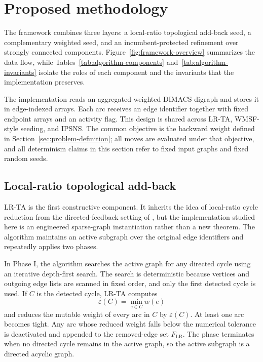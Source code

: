 \section{Proposed methodology}
\label{sec:algorithmic-framework}

The framework combines three layers: a local-ratio topological add-back seed, a complementary weighted seed, and an incumbent-protected refinement over strongly connected components. Figure~\ref{fig:framework-overview} summarizes the data flow, while Tables~\ref{tab:algorithm-components} and~\ref{tab:algorithm-invariants} isolate the roles of each component and the invariants that the implementation preserves.





The implementation reads an aggregated weighted DIMACS digraph and stores it in edge-indexed arrays. Each arc receives an edge identifier together with fixed endpoint arrays and an activity flag. This design is shared across LR-TA, WMSF-style seeding, and IPSNS. The common objective is the backward weight defined in Section~\ref{sec:problem-definition}; all moves are evaluated under that objective, and all determinism claims in this section refer to fixed input graphs and fixed random seeds.

\subsection{Local-ratio topological add-back}
\label{subsec:lrta}

LR-TA is the first constructive component. It inherits the idea of local-ratio cycle reduction from the directed-feedback setting of \cite{DF03}, but the implementation studied here is an engineered sparse-graph instantiation rather than a new theorem. The algorithm maintains an active subgraph over the original edge identifiers and repeatedly applies two phases.

In Phase I, the algorithm searches the active graph for any directed cycle using an iterative depth-first search. The search is deterministic because vertices and outgoing edge lists are scanned in fixed order, and only the first detected cycle is used. If \(C\) is the detected cycle, LR-TA computes
\begin{equation}
    \varepsilon(C)=\min_{e\in C} w(e)
    \label{eq:lrta-epsilon}
\end{equation}
and reduces the mutable weight of every arc in \(C\) by \(\varepsilon(C)\). At least one arc becomes tight. Any arc whose reduced weight falls below the numerical tolerance is deactivated and appended to the removed-edge set \(F_{\mathrm{LR}}\). The phase terminates when no directed cycle remains in the active graph, so the active subgraph is a directed acyclic graph.

